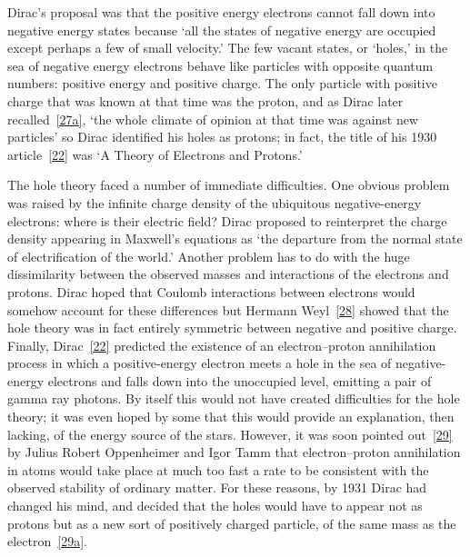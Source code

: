 Dirac's proposal was that the positive energy electrons cannot fall down
into negative energy states because `all the states of negative energy are
occupied except perhaps a few of small velocity.' The few vacant states,
or `holes,' in the sea of negative energy electrons behave like particles with
opposite quantum numbers: positive energy and positive charge. The only
particle with positive charge that was known at that time was the proton,
and as Dirac later recalled~\hyperref[ref:1.27a]{[27a]}, `the whole climate of opinion at that time
was against new particles' so Dirac identified his holes as protons; in fact,
the title of his 1930 article~\hyperref[ref:1.22]{[22]} was `A Theory of Electrons and Protons.'

The hole theory faced a number of immediate difficulties. One obvious
problem was raised by the infinite charge density of the ubiquitous
negative-energy electrons: where is their electric field? Dirac proposed to
reinterpret the charge density appearing in Maxwell's equations as `the
departure from the normal state of electrification of the world.' Another
problem has to do with the huge dissimilarity between the observed
masses and interactions of the electrons and protons. Dirac hoped that
Coulomb interactions between electrons would somehow account for these
differences but Hermann Weyl~\hyperref[ref:1.28]{[28]} showed that the hole theory was in fact
entirely symmetric between negative and positive charge. Finally, Dirac~\hyperref[ref:1.22]{[22]}
predicted the existence of an electron--proton annihilation process in which
a positive-energy electron meets a hole in the sea of negative-energy electrons
and falls down into the unoccupied level, emitting a pair of gamma
ray photons. By itself this would not have created difficulties for the hole
theory; it was even hoped by some that this would provide an explanation,
then lacking, of the energy source of the stars. However, it was
soon pointed out~\hyperref[ref:1.29]{[29]} by Julius Robert Oppenheimer and Igor Tamm that
electron--proton annihilation in atoms would take place at much too fast
a rate to be consistent with the observed stability of ordinary matter. For
these reasons, by 1931 Dirac had changed his mind, and decided that the
holes would have to appear not as protons but as a new sort of positively
charged particle, of the same mass as the electron~\hyperref[ref:1.29a]{[29a]}.


